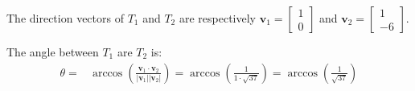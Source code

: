 \documentclass{article}
\newcommand{\abs}[1]{\left|#1\right|}
\newcommand{\dr}[1]{\textcolor{dark_red}{#1}}
\begin{document}

\dr{The direction vectors of \(T_1\) and \(T_2\) are respectively \(\mathbf{v}_1 = \begin{bmatrix} 1 \\ 0 \end{bmatrix}\) and \(\mathbf{v}_2 = \begin{bmatrix} 1 \\ -6 \end{bmatrix}\).} 

\dr{The angle between \(T_1\) are \(T_2\) is: 
\begin{align*}
\theta = & \arccos\left(\frac{\mathbf{v}_1 \cdot \mathbf{v}_2}{\abs{\mathbf{v}_1} \abs{\mathbf{v}_2}}\right) 
= \arccos\left(\frac{1}{1 \cdot \sqrt{37}}\right) 
= \arccos\left(\frac{1}{\sqrt{37}}\right)
\end{align*}}


 
\end{document}
